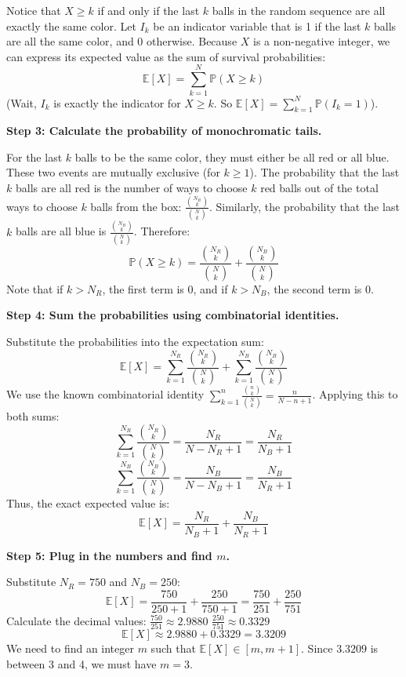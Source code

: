 \begin{solution}
Notice that $X \geq k$ if and only if the last $k$ balls in the random sequence are all exactly the same color.
Let $I_k$ be an indicator variable that is 1 if the last $k$ balls are all the same color, and 0 otherwise.
Because $X$ is a non-negative integer, we can express its expected value as the sum of survival probabilities:
\[ \mathbb{E}[X] = \sum_{k=1}^N \mathbb{P}(X \geq k) \]
(Wait, $I_k$ is exactly the indicator for $X \geq k$. So $\mathbb{E}[X] = \sum_{k=1}^N \mathbb{P}(I_k = 1)$).

\textbf{Step 3: Calculate the probability of monochromatic tails.}

For the last $k$ balls to be the same color, they must either be all red or all blue. These two events are mutually exclusive (for $k \geq 1$).
The probability that the last $k$ balls are all red is the number of ways to choose $k$ red balls out of the total ways to choose $k$ balls from the box: $\frac{\binom{N_R}{k}}{\binom{N}{k}}$.
Similarly, the probability that the last $k$ balls are all blue is $\frac{\binom{N_B}{k}}{\binom{N}{k}}$.
Therefore:
\[ \mathbb{P}(X \geq k) = \frac{\binom{N_R}{k}}{\binom{N}{k}} + \frac{\binom{N_B}{k}}{\binom{N}{k}} \]
Note that if $k > N_R$, the first term is 0, and if $k > N_B$, the second term is 0.

\textbf{Step 4: Sum the probabilities using combinatorial identities.}

Substitute the probabilities into the expectation sum:
\[ \mathbb{E}[X] = \sum_{k=1}^{N_R} \frac{\binom{N_R}{k}}{\binom{N}{k}} + \sum_{k=1}^{N_B} \frac{\binom{N_B}{k}}{\binom{N}{k}} \]
We use the known combinatorial identity $\sum_{k=1}^n \frac{\binom{n}{k}}{\binom{N}{k}} = \frac{n}{N-n+1}$.
Applying this to both sums:
\[ \sum_{k=1}^{N_R} \frac{\binom{N_R}{k}}{\binom{N}{k}} = \frac{N_R}{N - N_R + 1} = \frac{N_R}{N_B + 1} \]
\[ \sum_{k=1}^{N_B} \frac{\binom{N_B}{k}}{\binom{N}{k}} = \frac{N_B}{N - N_B + 1} = \frac{N_B}{N_R + 1} \]
Thus, the exact expected value is:
\[ \mathbb{E}[X] = \frac{N_R}{N_B + 1} + \frac{N_B}{N_R + 1} \]

\textbf{Step 5: Plug in the numbers and find $m$.}

Substitute $N_R = 750$ and $N_B = 250$:
\[ \mathbb{E}[X] = \frac{750}{250 + 1} + \frac{250}{750 + 1} = \frac{750}{251} + \frac{250}{751} \]
Calculate the decimal values:
$\frac{750}{251} \approx 2.9880$
$\frac{250}{751} \approx 0.3329$
\[ \mathbb{E}[X] \approx 2.9880 + 0.3329 = 3.3209 \]
We need to find an integer $m$ such that $\mathbb{E}[X] \in [m, m+1]$.
Since $3.3209$ is between 3 and 4, we must have $m = 3$.
\end{solution}

